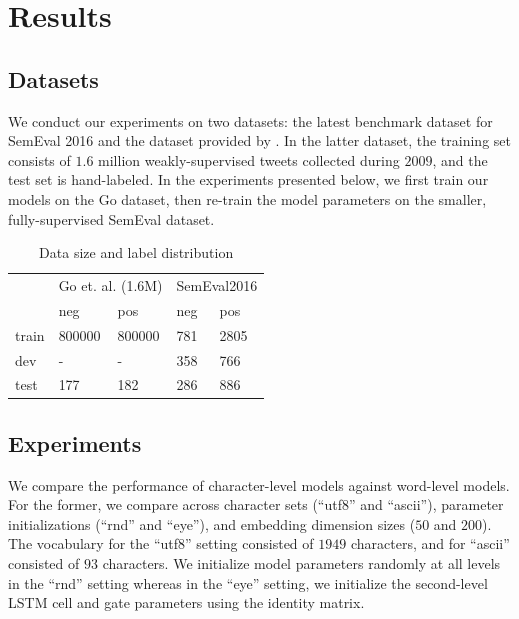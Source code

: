 \documentclass{article} %
\begin{document}
\section{Results}

\subsection{Datasets}
We conduct our experiments on two datasets: the latest benchmark dataset for SemEval 2016 and the dataset provided by \cite{go2009twitter}. In the latter dataset, the training set consists of $1.6$ million weakly-supervised tweets collected during $2009$, and the test set is hand-labeled. In the experiments presented below, we first train our models on the Go dataset, then re-train the model parameters on the smaller, fully-supervised SemEval dataset.

\begin{table}[h!]
\centering
\caption{Data size and label distribution}
\begin{tabular}{|lllll|}
\hline
      & \multicolumn{2}{l}{Go et. al. (1.6M)} & \multicolumn{2}{l}{SemEval2016} \\
      & neg               & pos               & neg            & pos            \\
\hline
train & 800000            & 800000            & 781            & 2805           \\
dev   & -                 & -                 & 358            & 766            \\
test  & 177               & 182               & 286            & 886           \\
\hline
\end{tabular}
\label{table:corpus}
\end{table}

\subsection{Experiments}
We compare the performance of character-level models against word-level models. For the former, we compare across character sets (``utf8'' and ``ascii''), parameter initializations (``rnd'' and ``eye''), and embedding dimension sizes ($50$ and $200$). The vocabulary for the ``utf8'' setting consisted of $1949$ characters, and for ``ascii'' consisted of $93$ characters. We initialize model parameters randomly at all levels in the ``rnd'' setting whereas in the ``eye'' setting, we initialize the second-level LSTM cell and gate parameters using the identity matrix.
\end{document}

